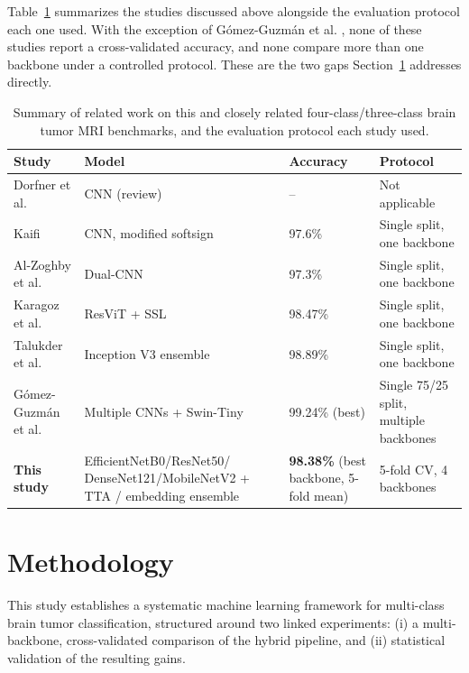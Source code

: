 \documentclass[11pt]{article}
\begin{document}
Table~\ref{tab:related_work} summarizes the studies discussed above alongside the evaluation protocol each one used. With the exception of G\'omez-Guzm\'an et al. \cite{gomezguzman2025swin}, none of these studies report a cross-validated accuracy, and none compare more than one backbone under a controlled protocol. These are the two gaps Section~\ref{sec:methodology} addresses directly.

\begin{table}[htbp]
\centering
\caption{Summary of related work on this and closely related four-class/three-class brain tumor MRI benchmarks, and the evaluation protocol each study used.}
\label{tab:related_work}
\small
\begin{tabular}{@{}p{2.6cm}p{3.2cm}p{1.6cm}p{3.4cm}@{}}
\toprule
\textbf{Study} & \textbf{Model} & \textbf{Accuracy} & \textbf{Protocol} \\
\midrule
Dorfner et al. \cite{r16} & CNN (review) & -- & Not applicable \\
Kaifi \cite{r17} & CNN, modified softsign & 97.6\% & Single split, one backbone \\
Al-Zoghby et al. \cite{r18} & Dual-CNN & 97.3\% & Single split, one backbone \\
Karagoz et al. \cite{r19} & ResViT + SSL & 98.47\% & Single split, one backbone \\
Talukder et al. \cite{r20} & Inception V3 ensemble & 98.89\% & Single split, one backbone \\
G\'omez-Guzm\'an et al. \cite{gomezguzman2025swin} & Multiple CNNs + Swin-Tiny & 99.24\% (best) & Single 75/25 split, multiple backbones \\
\textbf{This study} & EfficientNetB0/ResNet50/ DenseNet121/MobileNetV2 + TTA / embedding ensemble & \textbf{98.38\%} (best backbone, 5-fold mean) & 5-fold CV, 4 backbones \\
\bottomrule
\end{tabular}
\end{table}


\section{Methodology}
\label{sec:methodology}

This study establishes a systematic machine learning framework for multi-class brain tumor classification, structured around two linked experiments: (i) a multi-backbone, cross-validated comparison of the hybrid pipeline, and (ii) statistical validation of the resulting gains.
\end{document}
